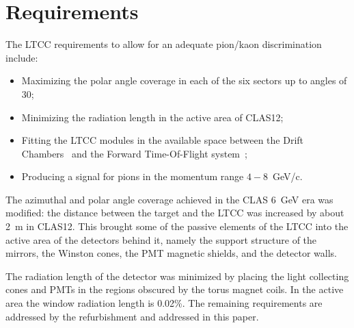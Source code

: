 \section{Requirements}

The LTCC requirements to allow for an adequate pion/kaon discrimination include:

\begin{itemize}
	\item Maximizing the polar angle coverage in each of the six sectors up to angles of 30\mdeg;
	\item Minimizing the radiation length in the active area of CLAS12;
	\item Fitting the LTCC modules in the available space between the Drift Chambers~\cite{dc-nim} and the Forward
          Time-Of-Flight system~\cite{ftof-nim};
	\item Producing a signal for pions in the momentum range $4-8$~GeV/c.
\end{itemize}

The azimuthal and polar angle coverage achieved in the CLAS 6~GeV era was modified: the
distance between the target and the LTCC was increased by about 2~m in CLAS12. This brought some of the passive
elements of the LTCC into the active area of the detectors behind it, namely the support structure of the mirrors, the
Winston cones, the PMT magnetic shields, and the detector walls.

The radiation length of the detector was minimized by placing the light collecting cones and PMTs in the regions
obscured by the torus magnet coils. In the active area the window radiation length is 0.02\%. The remaining
requirements are addressed by the refurbishment and addressed in this paper.
